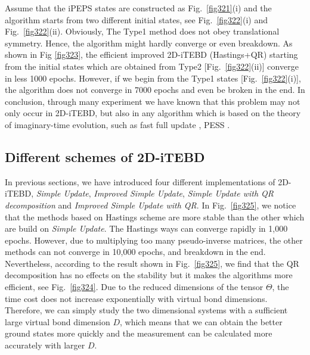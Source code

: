 Assume that the iPEPS states are constructed as Fig.~\ref{fig321}(i) and the algorithm starts from two different initial states, see Fig.~\ref{fig322}(i) and Fig.~\ref{fig322}(ii). Obviously, The Type1 method does not obey translational symmetry. Hence, the algorithm might hardly converge or even breakdown. As shown in Fig \ref{fig323}, the efficient improved 2D-iTEBD (Hastings+QR) starting from the initial states which are obtained from Type2 [Fig.~\ref{fig322}(ii)] converge in less 1000 epochs. However, if we begin from the Type1 states [Fig.~\ref{fig322}(i)], the algorithm does not converge in 7000 epochs and even be broken in the end. 
In conclusion, through many experiment we have known that this problem may not only occur in 2D-iTEBD, but also in any algorithm which is based on the theory of imaginary-time evolution, such as fast full update \cite{PhysRevB.92.035142}, PESS \cite{PhysRevX.4.011025}.

\subsection{Different schemes of 2D-iTEBD}

In previous sections, we have introduced four different implementations of 2D-iTEBD, \textit{Simple Update}, \textit{Improved Simple Update}, \textit{Simple Update with QR decomposition} and \textit{Improved Simple Update with QR}. In Fig.~\ref{fig325}, we notice that the methods based on Hastings scheme are more stable than the other which are build on \textit{Simple Update}. The Hastings ways can converge rapidly in 1,000 epochs. However, due to multiplying too many pseudo-inverse matrices, the other methods can not converge in 10,000 epochs, and breakdown in the end. Nevertheless, according to the result shown in Fig.~\ref{fig325}, we find that the QR decomposition has no effects on the stability but it makes the algorithms more efficient, see Fig.~\ref{fig324}. Due to the reduced dimensions of the tensor $\Theta$, the time cost does not increase exponentially with virtual bond dimensions. Therefore, we can simply study the two dimensional systems with a sufficient large virtual bond dimension $D$, which means that we can obtain the better ground states more quickly and the measurement can be calculated more accurately with larger $D$.

